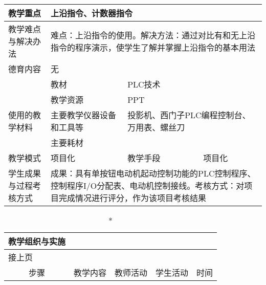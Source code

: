 {\begin{longtable}{|m{20mm}|m{20mm}|m{20mm}|m{20mm}|m{20mm}|m{28mm}|}
\hline
\centering 教学重点 & \multicolumn{5}{m{108mm}|}{上沿指令、计数器指令}\\
\hline
\centering 教学难点与解决办法 &\multicolumn{5}{m{108mm}|}{难点：上沿指令的使用。解决方法：通过对比有和无上沿指令的程序演示，使学生了解并掌握上沿指令的基本用法}\\
\hline
\centering 德育内容 &\multicolumn{5}{m{108mm}|}{无}\\
\hline
 &教材 & \multicolumn{4}{l|}{PLC技术}\\
\cline{2-6}& 教学资源 &\multicolumn{4}{m{88mm}|}{PPT}\\
\cline{2-6}\centering 使用的教学材料& 主要教学仪器设备和工具等 &\multicolumn{4}{m{88mm}|}{投影机、西门子PLC编程控制台、万用表、螺丝刀}\\
\cline{2-6}& 主要耗材 &\multicolumn{4}{m{88mm}|}{\qquad}\\
\hline
\centering 教学模式 &\multicolumn{2}{l|}{项目化}&\centering 教学手段 &\multicolumn{2}{l|}{项目化}\\
\hline
\centering 学生成果与过程考核方式 &\multicolumn{5}{m{108mm}|}{成果：具有单按钮电动机起动控制功能的PLC控制程序、控制程序I/O分配表、电动机控制接线。考核方式：对项目完成情况进行评分，作为该项目考核结果}
\end{longtable}
\clearpage


\begin{landscape}
\begin{longtable}{|m{10mm}|m{50mm}|m{50mm}|m{50mm}|m{15mm}|}
\caption*{\huge 教学组织与实施}\\
\hline
\endfirsthead
\multicolumn{5}{l}{\small 接上页}\\
\hline
\multicolumn{1}{|c|}{步骤}&\multicolumn{1}{c|}{教学内容}&\multicolumn{1}{c|}{教师活动}&\multicolumn{1}{c|}{学生活动}&\multicolumn{1}{c|}{时间}\\
\hline
\endhead


\end{longtable}
\end{landscape}}
